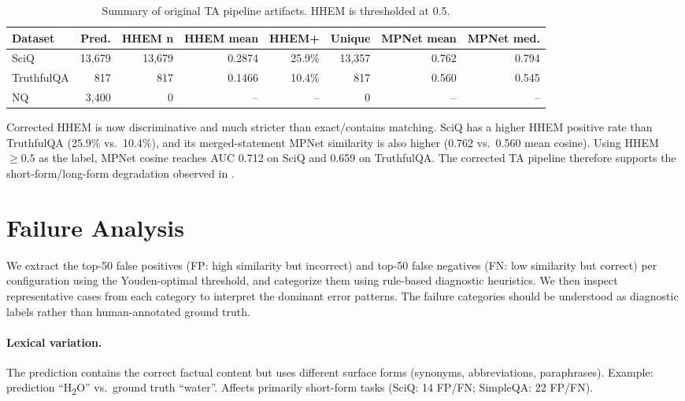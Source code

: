 \documentclass{article}
\begin{document}
\begin{table}[t]
\centering
\caption{Summary of original TA pipeline artifacts. HHEM is thresholded at 0.5.}
\label{tab:ta-original}
\small
\setlength{\tabcolsep}{4pt}
\begin{tabular}{lrrrrrrr}
\toprule
\textbf{Dataset} & \textbf{Pred.} & \textbf{HHEM n} & \textbf{HHEM mean}
  & \textbf{HHEM+} & \textbf{Unique} & \textbf{MPNet mean} & \textbf{MPNet med.} \\
\midrule
SciQ       & 13,679 & 13,679 & 0.2874 & 25.9\% & 13,357 & 0.762 & 0.794 \\
TruthfulQA &    817 &    817 & 0.1466 & 10.4\% &    817 & 0.560 & 0.545 \\
NQ         &  3,400 &      0 & --     & --      & 0 & --    & --    \\
\bottomrule
\end{tabular}
\end{table}

Corrected HHEM is now discriminative and much stricter than exact/contains
matching.  SciQ has a higher HHEM positive rate than TruthfulQA (25.9\% vs.\
10.4\%), and its merged-statement MPNet similarity is also higher (0.762 vs.\
0.560 mean cosine).  Using HHEM $\ge 0.5$ as the label, MPNet cosine reaches
AUC 0.712 on SciQ and 0.659 on TruthfulQA.  The corrected TA pipeline therefore
supports the short-form/long-form degradation observed in .

\section{Failure Analysis}
\label{sec:failure}

We extract the top-50 false positives (FP: high similarity but incorrect) and
top-50 false negatives (FN: low similarity but correct) per configuration using
the Youden-optimal threshold, and categorize them using rule-based diagnostic
heuristics.
We then inspect representative cases from each category to interpret the dominant
error patterns.
The failure categories should be understood as diagnostic labels rather than
human-annotated ground truth.

\paragraph{Lexical variation.}
The prediction contains the correct factual content but uses different surface forms
(synonyms, abbreviations, paraphrases).
Example: prediction ``H\textsubscript{2}O'' vs.\ ground truth ``water''.
Affects primarily short-form tasks (SciQ: 14 FP/FN; SimpleQA: 22 FP/FN).
\end{document}

